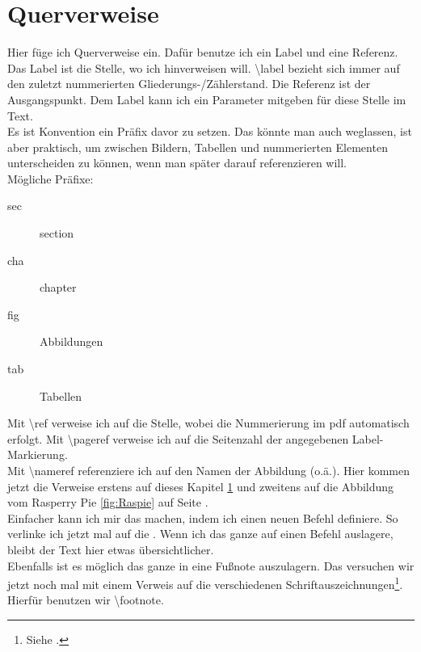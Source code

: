 
\section{Querverweise}

\label{sec:Gliederung}

Hier füge ich Querverweise ein. Dafür benutze ich ein Label und eine Referenz. 
Das Label ist die Stelle, wo ich hinverweisen will. 
\textbackslash label bezieht sich immer auf den zuletzt nummerierten Gliederungs-/Zählerstand.
Die Referenz ist der Ausgangspunkt.
Dem Label kann ich ein Parameter mitgeben für diese Stelle im Text. \\
Es ist Konvention ein Präfix davor zu setzen. Das könnte man auch weglassen, ist aber
praktisch, um zwischen Bildern, Tabellen und nummerierten Elementen unterscheiden zu 
können, wenn man später darauf referenzieren will. \\
\noindent Mögliche Präfixe: 
\begin{description}
    \item [sec] section
    \item [cha] chapter 
    \item [fig] Abbildungen
    \item [tab] Tabellen
\end{description}
Mit \textbackslash ref verweise ich auf die Stelle, wobei die Nummerierung im pdf automatisch erfolgt. 
Mit \textbackslash pageref verweise ich auf die Seitenzahl der angegebenen Label-Markierung. \\
Mit \textbackslash nameref referenziere ich auf den Namen der Abbildung (o.ä.).
Hier kommen jetzt die Verweise erstens auf dieses Kapitel \ref{sec:Gliederung} und zweitens auf 
die Abbildung  vom Rasperry Pie \ref{fig:Raspie} auf Seite \pageref{sec:Gliederung}. \\
Einfacher kann ich mir das machen, indem ich einen neuen Befehl definiere. So verlinke ich jetzt
mal auf die . Wenn ich das ganze auf einen Befehl auslagere, bleibt der Text 
hier etwas übersichtlicher. \\
Ebenfalls ist es möglich das ganze in eine Fußnote auszulagern. Das versuchen wir jetzt noch
mal mit einem Verweis auf die verschiedenen Schriftauszeichnungen\footnote{Siehe .}. Hierfür benutzen wir \textbackslash footnote.

